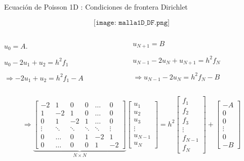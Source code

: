 \documentclass[handout]{beamer}
\begin{document}
\begin{frame}{Ecuaci\'on de Poisson 1D : Condiciones de frontera Dirichlet}

$$\texttt{[image: malla1D\_DF.png]}$$

\begin{small}

\begin{columns}
\begin{column}{0.45\textwidth}
$ u_0  = A $.

$u_{0} - 2 u_{1} + u_{2} = h^2 f_1$ 

$\Rightarrow \boxed{-2 u_{1} + u_{2} = h^2 f_1 - A}$
\end{column}
\begin{column}{0.45\textwidth}
$ u_{N+1}  = B$

$u_{N-1} - 2 u_{N} + u_{N+1} = h^2 f_N$

$\Rightarrow \boxed{u_{N-1} - 2 u_{N} = h^2 f_N - B}$
\end{column}
\end{columns}

\pause

\strut
\[ 
\Longrightarrow
\underbrace{
\left[
  \begin{matrix}
    -2 & 1 & 0 & 0 & \dots & 0  \\
    1 & -2 & 1 & 0 & \dots & 0  \\
    0 & 1 & -2 & 1 & \dots & 0  \\
    \vdots & \ddots & \ddots & \ddots & \ddots & \vdots \\
    0 & \dots & 0 & 1 & -2 & 1   \\
    0 & \dots & 0 & 0 & 1 & -2    
  \end{matrix}
\right]}_{N \times N}
\left[
\begin{matrix}
u_1 \\ u_2 \\ u_3 \\ \vdots \\ u_{N-1} \\ u_N
\end{matrix}
\right]= 
h^2 \left[
\begin{matrix}
f_1 \\ f_2 \\ f_3 \\ \vdots \\ f_{N-1} \\ f_N
\end{matrix}
\right] +
\left[
\begin{matrix}
-A \\ 0 \\ 0 \\ \vdots \\ 0 \\ -B
\end{matrix}
\right]
\]
\end{small}

\end{frame}
\end{document}
